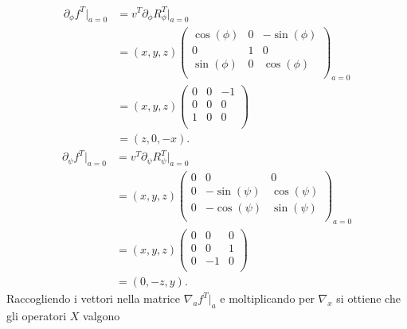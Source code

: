 \documentclass[fleqn,italian]{article}
\theoremstyle{definition}
\theoremstyle{remark}
\theoremstyle{plain}%
\theoremstyle{definition}
\theoremstyle{remark}
\numberwithin{equation}{section}
\numberwithin{thm}{section}
\begin{document}
\begin{equation}
\begin{split}
\partial_\phi f^T\vert_{a=0} &= v^T \partial_\phi R_\phi^T\vert_{a=0} \\
          &= (x,y,z) \begin{pmatrix}  
                 \cos(\phi) & 0 & -\sin(\phi) \\
                      0     & 1 & 0 \\
                 \sin(\phi) & 0 & \cos(\phi) \\ \end{pmatrix}_{a=0} \\
          &= (x,y,z) \begin{pmatrix} 
                          0 & 0 & -1 \\ 0 & 0 & 0 \\ 1 & 0 & 0 \\
                          \end{pmatrix} \\
          &= (z,0,-x).
\end{split}
\end{equation}
\begin{equation}
\begin{split}
\partial_\psi f^T\vert_{a=0} &= v^T \partial_\psi R_\psi^T\vert_{a=0} \\
          &= (x,y,z) \begin{pmatrix}  
                   0 &      0      & 0 \\
                   0 & -\sin(\psi) & \cos(\psi) \\
                   0 & -\cos(\psi) & \sin(\psi) \\ \end{pmatrix}_{a=0} \\
          &= (x,y,z) \begin{pmatrix} 
                          0 & 0 & 0 \\ 0 & 0 & 1 \\ 0 & -1 & 0 \\
                          \end{pmatrix} \\
          &= (0,-z,y).
\end{split}
\end{equation}
Raccogliendo i vettori nella matrice $\nabla_a f^T\vert_a$ e moltiplicando
per $\nabla_x$ si ottiene che gli operatori $X$ valgono
\end{document}
